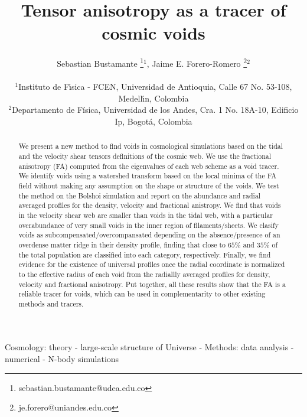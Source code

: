 \documentclass[a4,useAMS,usenatbib,usegraphicx]{mn2e}
\begin{document}
\title{Tensor anisotropy as a tracer of cosmic voids}
\author[S. Bustamante and J.E. Forero-Romero]{
\parbox[t]{\textwidth}{\raggedright 
  Sebastian Bustamante \thanks{sebastian.bustamante@udea.edu.co}$^{1}$,
  Jaime E. Forero-Romero \thanks{je.forero@uniandes.edu.co}$^{2}$ 
}
\vspace*{6pt}\\
$^1$Instituto de F\'{\i}sica - FCEN, Universidad de Antioquia, Calle
67 No. 53-108, Medell\'{\i}n, Colombia\\ 
$^2$Departamento de F\'{i}sica, Universidad de los Andes, Cra. 1
No. 18A-10, Edificio Ip, Bogot\'a, Colombia
}

\maketitle

\begin{abstract}
We present a new method to find voids in cosmological simulations
based on the tidal and the velocity shear tensors
definitions of the cosmic web. 
We use the fractional anisotropy (FA) computed from the eigenvalues
of each web scheme as a void tracer.
We identify voids using a watershed transform based on the local
minima of the FA field without making any assumption on the shape or
structure of the voids.  
We test the method on the Bolshoi simulation and report on the
abundance and radial averaged profiles for the density, velocity and
fractional anistropy.
We find that voids in the velocity shear web are smaller than voids in
the tidal web, with a particular overabundance of very small voids in
the inner region of filaments/sheets.
We clasify voids as subcompensated/overcompansated depending on the
absence/presence of an overdense matter ridge in their density
profile, finding that close to $65\%$ and $35\%$ of the total
population are classified into each category, respectively.
Finally, we find evidence for the existence of universal profiles once the
radial coordinate is normalized to the effective radius of each void
from the radiallly averaged profiles for density, velocity and
fractional anisotropy. 
Put together, all these results show that the FA is a reliable tracer
for voids, which can be used in complementarity to other existing
methods and tracers.
\end{abstract}

\begin{keywords}
Cosmology: theory - large-scale structure of Universe -
Methods: data analysis - numerical - N-body simulations
\end{keywords}
\end{document}

